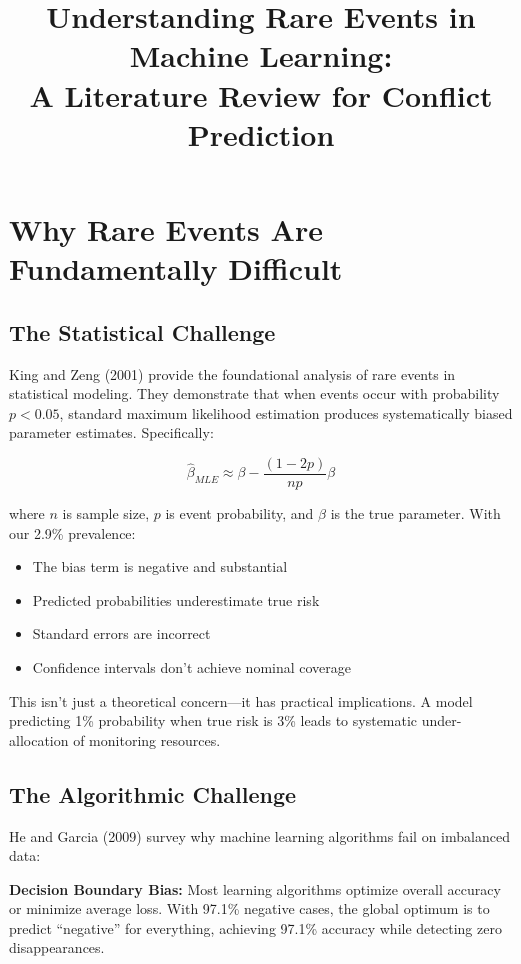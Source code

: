 \documentclass{article}
\title{Understanding Rare Events in Machine Learning: \\
A Literature Review for Conflict Prediction}
\author{}
\date{}
\begin{document}
\maketitle

\section{Why Rare Events Are Fundamentally Difficult}

\subsection{The Statistical Challenge}

King and Zeng (2001) provide the foundational analysis of rare events in statistical modeling. They demonstrate that when events occur with probability $p < 0.05$, standard maximum likelihood estimation produces systematically biased parameter estimates. Specifically:

\begin{equation}
\hat{\beta}_{MLE} \approx \beta - \frac{(1-2p)}{np}\beta
\end{equation}

where $n$ is sample size, $p$ is event probability, and $\beta$ is the true parameter. With our 2.9\% prevalence:
\begin{itemize}
    \item The bias term is negative and substantial
    \item Predicted probabilities underestimate true risk
    \item Standard errors are incorrect
    \item Confidence intervals don't achieve nominal coverage
\end{itemize}

This isn't just a theoretical concern---it has practical implications. A model predicting 1\% probability when true risk is 3\% leads to systematic under-allocation of monitoring resources.

\subsection{The Algorithmic Challenge}

He and Garcia (2009) survey why machine learning algorithms fail on imbalanced data:

\textbf{Decision Boundary Bias:} Most learning algorithms optimize overall accuracy or minimize average loss. With 97.1\% negative cases, the global optimum is to predict ``negative'' for everything, achieving 97.1\% accuracy while detecting zero disappearances.
\end{document}
